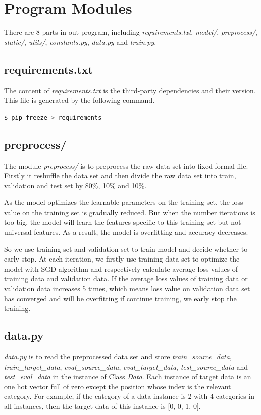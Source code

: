 \section{Program Modules}
\vspace*{-.05in}
There are 8 parts in out program, including \textsl{requirements.txt}, \textsl{model/}, \textsl{preprocess/}, \textsl{static/}, \textsl{utils/}, \textsl{constants.py}, \textsl{data.py} and \textsl{train.py}.

\subsection{requirements.txt}
The content of \textsl{requirements.txt} is the third-party dependencies and their version. This file is generated by the following command.
\begin{lstlisting}[language=bash]
$ pip freeze > requirements
\end{lstlisting}

\subsection{preprocess/}
The module \textsl{preprocess/} is to preprocess the raw data set into fixed formal file. Firstly it reshuffle the data set and then divide the raw data set into train, validation and test set by 80\%, 10\% and 10\%.

As the model optimizes the learnable parameters on the training set, the loss value on the training set is gradually reduced. But when the number iterations is too big, the model will learn the features specific to this training set but not universal features. As a result, the model is overfitting and accuracy decreases.

 So we use training set and validation set to train model and decide whether to early stop. At each iteration, we firstly use training data set to optimize the model with SGD algorithm and respectively calculate average loss values of training data and validation data. If the average loss values of training data or validation data increases 5 times, which means loss value on validation data set has converged and will be overfitting if continue training, we early stop the training.

\subsection{data.py}
\textsl{data.py} is to read the preprocessed data set and store \textsl{train\_source\_data}, \textsl{train\_target\_data}, \textsl{eval\_source\_data}, \textsl{eval\_target\_data}, \textsl{test\_source\_data} and \textsl{test\_eval\_data} in the instance of Class \textsl{Data}. Each instance of target data is an one hot vector full of zero except the position whose index is the relevant category. For example, if the category of a data instance is 2 with 4 categories in all instances, then the target data of this instance is [0, 0, 1, 0].

